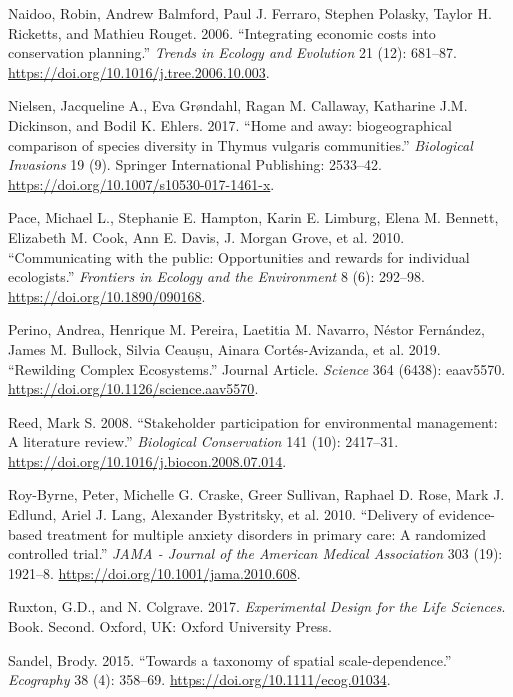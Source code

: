 \documentclass[fleqn,10pt]{wlpeerj} %
\begin{document}
\leavevmode\hypertarget{ref-Naidoo2006}{}%
Naidoo, Robin, Andrew Balmford, Paul J. Ferraro, Stephen Polasky, Taylor
H. Ricketts, and Mathieu Rouget. 2006. ``Integrating economic costs into
conservation planning.'' \emph{Trends in Ecology and Evolution} 21 (12):
681--87. \url{https://doi.org/10.1016/j.tree.2006.10.003}.

\leavevmode\hypertarget{ref-Nielsen2017}{}%
Nielsen, Jacqueline A., Eva Grøndahl, Ragan M. Callaway, Katharine J.M.
Dickinson, and Bodil K. Ehlers. 2017. ``Home and away: biogeographical
comparison of species diversity in Thymus vulgaris communities.''
\emph{Biological Invasions} 19 (9). Springer International Publishing:
2533--42. \url{https://doi.org/10.1007/s10530-017-1461-x}.

\leavevmode\hypertarget{ref-Pace2010}{}%
Pace, Michael L., Stephanie E. Hampton, Karin E. Limburg, Elena M.
Bennett, Elizabeth M. Cook, Ann E. Davis, J. Morgan Grove, et al. 2010.
``Communicating with the public: Opportunities and rewards for
individual ecologists.'' \emph{Frontiers in Ecology and the Environment}
8 (6): 292--98. \url{https://doi.org/10.1890/090168}.

\leavevmode\hypertarget{ref-Perino2019}{}%
Perino, Andrea, Henrique M. Pereira, Laetitia M. Navarro, Néstor
Fernández, James M. Bullock, Silvia Ceaușu, Ainara Cortés-Avizanda, et
al. 2019. ``Rewilding Complex Ecosystems.'' Journal Article.
\emph{Science} 364 (6438): eaav5570.
\url{https://doi.org/10.1126/science.aav5570}.

\leavevmode\hypertarget{ref-Reed2008}{}%
Reed, Mark S. 2008. ``Stakeholder participation for environmental
management: A literature review.'' \emph{Biological Conservation} 141
(10): 2417--31. \url{https://doi.org/10.1016/j.biocon.2008.07.014}.

\leavevmode\hypertarget{ref-Roy-Byrne2010}{}%
Roy-Byrne, Peter, Michelle G. Craske, Greer Sullivan, Raphael D. Rose,
Mark J. Edlund, Ariel J. Lang, Alexander Bystritsky, et al. 2010.
``Delivery of evidence-based treatment for multiple anxiety disorders in
primary care: A randomized controlled trial.'' \emph{JAMA - Journal of
the American Medical Association} 303 (19): 1921--8.
\url{https://doi.org/10.1001/jama.2010.608}.

\leavevmode\hypertarget{ref-Ruxton2017}{}%
Ruxton, G.D., and N. Colgrave. 2017. \emph{Experimental Design for the
Life Sciences}. Book. Second. Oxford, UK: Oxford University Press.

\leavevmode\hypertarget{ref-Sandel2015}{}%
Sandel, Brody. 2015. ``Towards a taxonomy of spatial scale-dependence.''
\emph{Ecography} 38 (4): 358--69.
\url{https://doi.org/10.1111/ecog.01034}.
\end{document}
